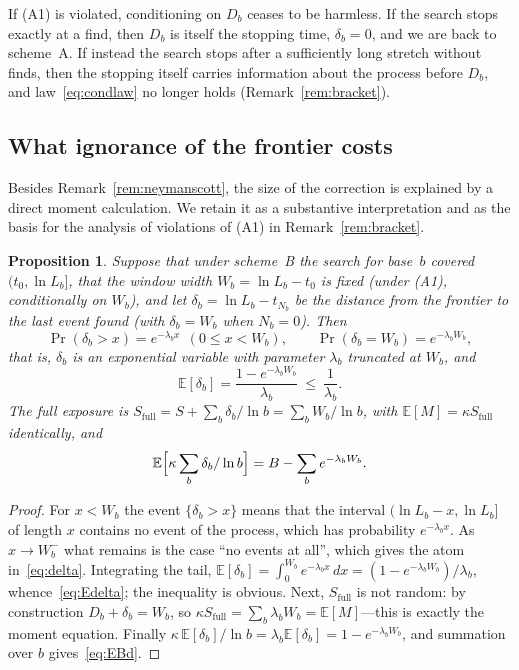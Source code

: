 \documentclass[11pt,a4paper]{article}
\theoremstyle{plain}
\newtheorem{proposition}{Proposition}
\theoremstyle{remark}
\begin{document}
\noindent If (A1) is violated, conditioning on $D_b$ ceases to be harmless. If
the search stops exactly at a find, then $D_b$ is itself the stopping time,
$\delta_b=0$, and we are back to scheme~A. If instead the search stops after a
sufficiently long stretch without finds, then the stopping itself carries
information about the process before $D_b$, and law~\eqref{eq:condlaw} no longer
holds (Remark~\ref{rem:bracket}).

\subsection{What ignorance of the frontier costs}\label{sec:cost}

Besides Remark~\ref{rem:neymanscott}, the size of the correction is explained by
a direct moment calculation. We retain it as a substantive interpretation and as
the basis for the analysis of violations of (A1) in Remark~\ref{rem:bracket}.

\begin{proposition}\label{prop:delta}
Suppose that under scheme~B the search for base~$b$ covered $(t_0,\ln L_b]$,
that the window width $W_b=\ln L_b-t_0$ is fixed (under (A1), conditionally on
$W_b$), and let $\delta_b=\ln L_b-t_{N_b}$ be the distance from the frontier to
the last event found (with $\delta_b=W_b$ when $N_b=0$). Then
\begin{equation}\label{eq:delta}
\Pr(\delta_b>x)=e^{-\lambda_b x}\ \ (0\le x<W_b),\qquad
\Pr(\delta_b=W_b)=e^{-\lambda_b W_b},
\end{equation}
that is, $\delta_b$ is an exponential variable with parameter $\lambda_b$
truncated at $W_b$, and
\begin{equation}\label{eq:Edelta}
\mathbb E[\delta_b]=\frac{1-e^{-\lambda_b W_b}}{\lambda_b}\ \le\ \frac{1}{\lambda_b}.
\end{equation}
The full exposure is
$S_{\mathrm{full}}=S+\sum_b\delta_b/\ln b=\sum_b W_b/\ln b$, with
$\mathbb E[M]=\kappa S_{\mathrm{full}}$ identically, and
\begin{equation}\label{eq:EBd}
\mathbb E\Bigl[\kappa\sum_b\delta_b/\ln b\Bigr]=B-\sum_b e^{-\lambda_b W_b}.
\end{equation}
\end{proposition}

\begin{proof}
For $x<W_b$ the event $\{\delta_b>x\}$ means that the interval
$(\ln L_b-x,\ln L_b]$ of length $x$ contains no event of the process, which has
probability $e^{-\lambda_b x}$. As $x\to W_b^-$ what remains is the case ``no
events at all'', which gives the atom in~\eqref{eq:delta}. Integrating the tail,
$\mathbb E[\delta_b]=\int_0^{W_b}e^{-\lambda_b x}\,dx=(1-e^{-\lambda_b W_b})/\lambda_b$,
whence~\eqref{eq:Edelta}; the inequality is obvious. Next, $S_{\mathrm{full}}$ is
not random: by construction $D_b+\delta_b=W_b$, so
$\kappa S_{\mathrm{full}}=\sum_b\lambda_b W_b=\mathbb E[M]$---this is exactly the
moment equation. Finally
$\kappa\,\mathbb E[\delta_b]/\ln b=\lambda_b\mathbb E[\delta_b]=1-e^{-\lambda_b W_b}$,
and summation over $b$ gives~\eqref{eq:EBd}.
\end{proof}
\end{document}
